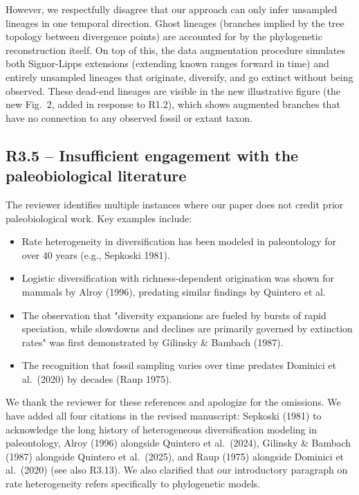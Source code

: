 \documentclass[11pt]{article}
\newcommand{\response}[1]{\noindent\textcolor{resp}{#1}\medskip}
\begin{document}
\response{However, we respectfully disagree that our approach can only infer unsampled lineages in one temporal direction. Ghost lineages (branches implied by the tree topology between divergence points) are accounted for by the phylogenetic reconstruction itself. On top of this, the data augmentation procedure simulates both Signor-Lipps extensions (extending known ranges forward in time) and entirely unsampled lineages that originate, diversify, and go extinct without being observed. These dead-end lineages are visible in the new illustrative figure (the new Fig.~2, added in response to R1.2), which shows augmented branches that have no connection to any observed fossil or extant taxon.}

\subsection*{R3.5 -- Insufficient engagement with the paleobiological literature}

The reviewer identifies multiple instances where our paper does not credit prior paleobiological work. Key examples include:
\begin{itemize}[nosep]
    \item Rate heterogeneity in diversification has been modeled in paleontology for over 40 years (e.g., Sepkoski 1981).
    \item Logistic diversification with richness-dependent origination was shown for mammals by Alroy (1996), predating similar findings by Quintero et al.
    \item The observation that "diversity expansions are fueled by bursts of rapid speciation, while slowdowns and declines are primarily governed by extinction rates" was first demonstrated by Gilinsky \& Bambach (1987).
    \item The recognition that fossil sampling varies over time predates Dominici et al.\ (2020) by decades (Raup 1975).
\end{itemize}

\response{We thank the reviewer for these references and apologize for the omissions. We have added all four citations in the revised manuscript: Sepkoski (1981) to acknowledge the long history of heterogeneous diversification modeling in paleontology, Alroy (1996) alongside Quintero et al.\ (2024), Gilinsky \& Bambach (1987) alongside Quintero et al.\ (2025), and Raup (1975) alongside Dominici et al.\ (2020) (see also R3.13). We also clarified that our introductory paragraph on rate heterogeneity refers specifically to phylogenetic models.}
\end{document}

